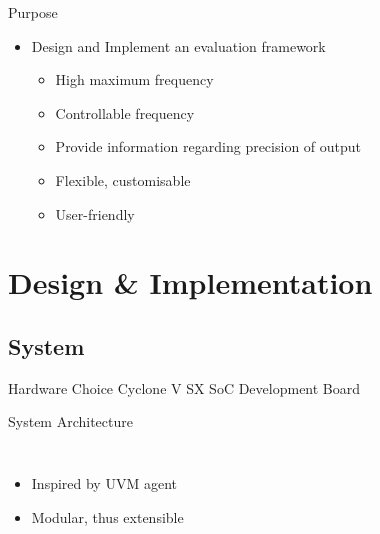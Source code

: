 \documentclass[t]{beamer}
\begin{document}
\begin{frame}{Purpose}
  \begin{itemize}
    \item Design and Implement an evaluation framework
    \begin{itemize}
      \item<+-> High maximum frequency
      \item<+-> Controllable frequency
      \item<+-> Provide information regarding precision of output
      \item<+-> Flexible, customisable
      \item<+-> User-friendly
    \end{itemize}
  \end{itemize}
\end{frame}

\section[D\&I]{Design \& Implementation}
\subsection{System}

\begin{frame}{Hardware Choice}
  Cyclone V SX SoC Development Board
  \begin{figure}[H]
    \centering
  \end{figure}
\end{frame}

\begin{frame}{System Architecture}
  \begin{columns}
    \begin{itemize}
    \item Inspired by UVM agent
    \item Modular, thus extensible
    \end{itemize}

  \begin{figure}[H]
    \centering
    \resizebox{\textwidth}{!}{%
      
    }
  \end{figure}
  \end{columns}
\end{frame}
\end{document}
